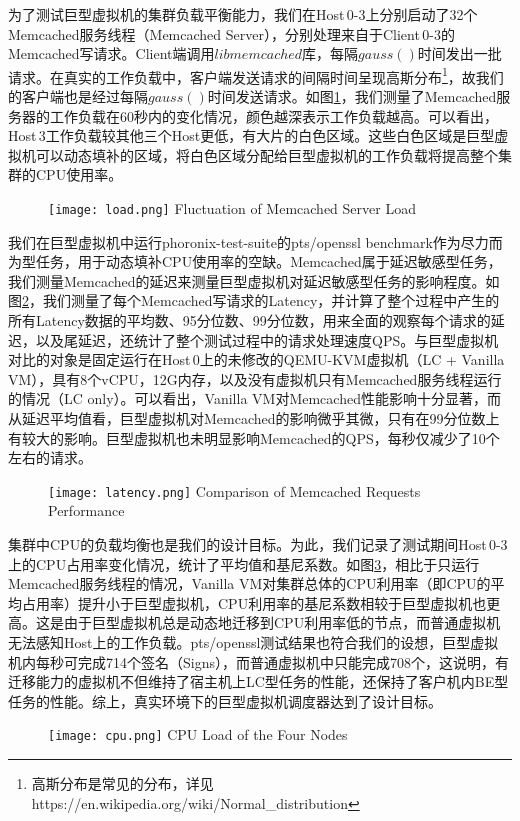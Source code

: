 为了测试巨型虚拟机的集群负载平衡能力，我们在Host\,0-3上分别启动了32个Memcached\cite{memcached}服务线程（Memcached Server），分别处理来自于Client\,0-3的Memcached写请求。Client端调用$libmemcached$库，每隔$gauss()$时间发出一批请求。在真实的工作负载中，客户端发送请求的间隔时间呈现高斯分布\footnote{高斯分布是常见的分布，详见https://en.wikipedia.org/wiki/Normal\_distribution}，故我们的客户端也是经过每隔$gauss()$时间发送请求。如图\ref{fig:load}，我们测量了Memcached服务器的工作负载在60秒内的变化情况，颜色越深表示工作负载越高。可以看出，Host\,3工作负载较其他三个Host更低，有大片的白色区域。这些白色区域是巨型虚拟机可以动态填补的区域，将白色区域分配给巨型虚拟机的工作负载将提高整个集群的CPU使用率。

\begin{figure}[!htp]
  \centering
  \texttt{[image: load.png]}
    {Fluctuation of Memcached Server Load}
  \label{fig:load}
\end{figure}

我们在巨型虚拟机中运行phoronix-test-suite\cite{phoronix}的pts/openssl benchmark作为尽力而为型任务，用于动态填补CPU使用率的空缺。Memcached属于延迟敏感型任务，我们测量Memcached的延迟来测量巨型虚拟机对延迟敏感型任务的影响程度。如图\ref{fig:latency}，我们测量了每个Memcached写请求的Latency，并计算了整个过程中产生的所有Latency数据的平均数、95分位数、99分位数，用来全面的观察每个请求的延迟，以及尾延迟，还统计了整个测试过程中的请求处理速度QPS。与巨型虚拟机对比的对象是固定运行在Host\,0上的未修改的QEMU-KVM虚拟机（LC + Vanilla VM），具有8个vCPU，12G内存，以及没有虚拟机只有Memcached服务线程运行的情况（LC only）。可以看出，Vanilla VM对Memcached性能影响十分显著，而从延迟平均值看，巨型虚拟机对Memcached的影响微乎其微，只有在99分位数上有较大的影响。巨型虚拟机也未明显影响Memcached的QPS，每秒仅减少了10个左右的请求。

\begin{figure}[!htp]
  \centering
  \texttt{[image: latency.png]}
    {Comparison of Memcached Requests Performance}
  \label{fig:latency}
\end{figure}
集群中CPU的负载均衡也是我们的设计目标。为此，我们记录了测试期间Host\,0-3上的CPU占用率变化情况，统计了平均值和基尼系数。如图\ref{fig:cpuload}，相比于只运行Memcached服务线程的情况，Vanilla VM对集群总体的CPU利用率（即CPU的平均占用率）提升小于巨型虚拟机，CPU利用率的基尼系数相较于巨型虚拟机也更高。这是由于巨型虚拟机总是动态地迁移到CPU利用率低的节点，而普通虚拟机无法感知Host上的工作负载。pts/openssl测试结果也符合我们的设想，巨型虚拟机内每秒可完成714个签名（Signs），而普通虚拟机中只能完成708个，这说明，有迁移能力的虚拟机不但维持了宿主机上LC型任务的性能，还保持了客户机内BE型任务的性能。综上，真实环境下的巨型虚拟机调度器达到了设计目标。
\begin{figure}[!htp]
  \centering
  \texttt{[image: cpu.png]}
    {CPU Load of the Four Nodes}
  \label{fig:cpuload}
\end{figure}

